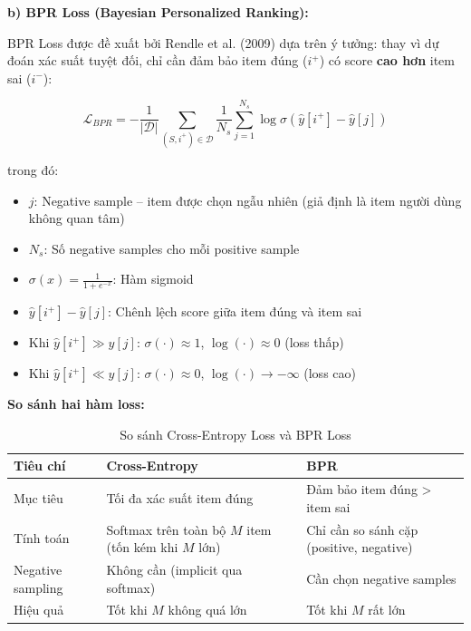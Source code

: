 \documentclass[12pt, a4paper]{article}
\begin{document}
\textbf{b) BPR Loss (Bayesian Personalized Ranking):}

BPR Loss được đề xuất bởi Rendle et al. (2009) \cite{rendle2009} dựa trên ý tưởng: thay vì dự đoán xác suất tuyệt đối, chỉ cần đảm bảo item đúng ($i^+$) có score \textbf{cao hơn} item sai ($i^-$):

\begin{equation}
\boxed{
    \mathcal{L}_{BPR} = -\frac{1}{|\mathcal{D}|} \sum_{(S, i^+) \in \mathcal{D}} \frac{1}{N_s} \sum_{j=1}^{N_s} \log \sigma\left(\hat{y}[i^+] - \hat{y}[j]\right)
}
\label{eq:bpr_loss}
\end{equation}

trong đó:
\begin{itemize}
    \item $j$: Negative sample -- item được chọn ngẫu nhiên (giả định là item người dùng không quan tâm)
    \item $N_s$: Số negative samples cho mỗi positive sample
    \item $\sigma(x) = \frac{1}{1 + e^{-x}}$: Hàm sigmoid
    \item $\hat{y}[i^+] - \hat{y}[j]$: Chênh lệch score giữa item đúng và item sai
    \item Khi $\hat{y}[i^+] \gg \hat{y}[j]$: $\sigma(\cdot) \approx 1$, $\log(\cdot) \approx 0$ (loss thấp)
    \item Khi $\hat{y}[i^+] \ll \hat{y}[j]$: $\sigma(\cdot) \approx 0$, $\log(\cdot) \rightarrow -\infty$ (loss cao)
\end{itemize}

\textbf{So sánh hai hàm loss:}

\begin{table}[H]
\centering
\caption{So sánh Cross-Entropy Loss và BPR Loss}
\label{tab:loss_compare}
\begin{tabular}{lp{5.5cm}p{5.5cm}}
\toprule
\textbf{Tiêu chí} & \textbf{Cross-Entropy} & \textbf{BPR} \\
\midrule
Mục tiêu & Tối đa xác suất item đúng & Đảm bảo item đúng > item sai \\
Tính toán & Softmax trên toàn bộ $M$ item (tốn kém khi $M$ lớn) & Chỉ cần so sánh cặp (positive, negative) \\
Negative sampling & Không cần (implicit qua softmax) & Cần chọn negative samples \\
Hiệu quả & Tốt khi $M$ không quá lớn & Tốt khi $M$ rất lớn \\
\bottomrule
\end{tabular}
\end{table}
\end{document}
